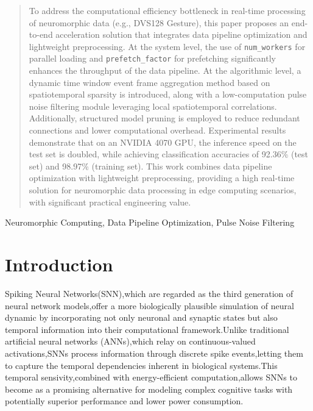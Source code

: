\documentclass[conference]{IEEEtran}
\begin{document}
\begin{abstract}
To address the computational efficiency bottleneck in real-time processing of neuromorphic data (e.g., DVS128 Gesture), 
this paper proposes an end-to-end acceleration solution that integrates data pipeline optimization and lightweight preprocessing. 
At the system level, the use of \texttt{num\_workers} for parallel loading and \texttt{prefetch\_factor} for prefetching significantly enhances the throughput of the data pipeline. 
At the algorithmic level, a dynamic time window event frame aggregation method based on spatiotemporal sparsity is introduced, along with a low-computation pulse noise filtering module leveraging local spatiotemporal correlations. 
Additionally, structured model pruning is employed to reduce redundant connections and lower computational overhead. Experimental results demonstrate that on an NVIDIA 4070 GPU, the inference speed on the test set is doubled, 
while achieving classification accuracies of 92.36\% (test set) and 98.97\% (training set). 
This work combines data pipeline optimization with lightweight preprocessing, providing a high real-time solution for neuromorphic data processing in edge computing scenarios, with significant practical engineering value.
\end{abstract}

\begin{IEEEkeywords}
Neuromorphic Computing, Data Pipeline Optimization, Pulse Noise Filtering
\end{IEEEkeywords}

\section{Introduction}
Spiking Neural Networks(SNN),which are regarded as the third generation of neural network models,offer a more biologically plausible simulation of neural dynamic by incorporating not only neuronal and synaptic states but also temporal information into their computational framework.\cite{b3,10.5555}Unlike traditional artificial neural networks (ANNs),which relay on continuous-valued activations,SNNs process information through discrete spike events,letting them to capture the temporal dependencies inherent in biological systems.This temporal sensivity,combined with energy-efficient computation,allows SNNs to become as a promising alternative for modeling complex cognitive tasks with potentially superior performance and lower power consumption.\cite{roy2019towards}
\end{document}
